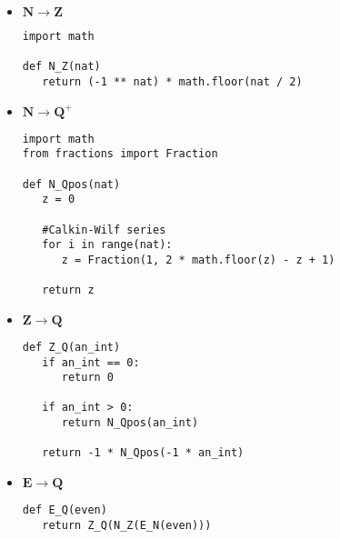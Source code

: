 \documentclass{exam}
\newcommand\N{\mathbf{N}}
\newcommand\Z{\mathbf{Z}}
\newcommand\E{\mathbf{E}}
\newcommand\Q{\mathbf{Q}}
\begin{document}
\begin{questions}
\begin{itemize}
    \item $\N \to \Z$

\begin{lstlisting}
import math

def N_Z(nat)
   return (-1 ** nat) * math.floor(nat / 2)
\end{lstlisting}

    \item $\N \to \Q^+$

\begin{lstlisting}
import math
from fractions import Fraction

def N_Qpos(nat)
   z = 0

   #Calkin-Wilf series
   for i in range(nat):
      z = Fraction(1, 2 * math.floor(z) - z + 1)

   return z
\end{lstlisting}

    \item $\Z \to \Q$

\begin{lstlisting}
def Z_Q(an_int)
   if an_int == 0:
      return 0

   if an_int > 0:
      return N_Qpos(an_int)

   return -1 * N_Qpos(-1 * an_int)
\end{lstlisting}

    \item $\E \to \Q$

\begin{lstlisting}
def E_Q(even)
   return Z_Q(N_Z(E_N(even)))
\end{lstlisting}

\end{itemize}

\question


\end{questions}
\end{document}
